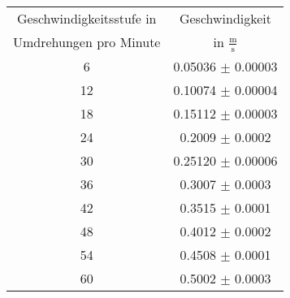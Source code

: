 \begin{center}
\begin{tabular}{c|c}
	Geschwindigkeitsstufe in & Geschwindigkeit \\
	Umdrehungen pro Minute & in $\frac{\text{m}}{\text{s}}$ \\
	\hline
	6 & 0.05036 $\pm$ 0.00003 \\
	12 & 0.10074 $\pm$ 0.00004 \\
	18 & 0.15112 $\pm$ 0.00003 \\
	24 & 0.2009 $\pm$ 0.0002 \\
	30 & 0.25120 $\pm$ 0.00006 \\
	36 & 0.3007 $\pm$ 0.0003 \\
	42 & 0.3515 $\pm$ 0.0001 \\
	48 & 0.4012 $\pm$ 0.0002 \\
	54 & 0.4508 $\pm$ 0.0001 \\
	60 & 0.5002 $\pm$ 0.0003 \\
\end{tabular}
\end{center}